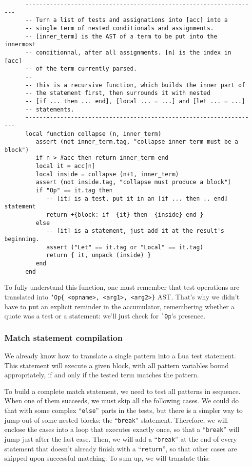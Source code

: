 \begin{verbatim}
      -------------------------------------------------------------------
      -- Turn a list of tests and assignations into [acc] into a
      -- single term of nested conditionals and assignments.
      -- [inner_term] is the AST of a term to be put into the innermost
      -- conditionnal, after all assignments. [n] is the index in [acc]
      -- of the term currently parsed.
      -- 
      -- This is a recursive function, which builds the inner part of
      -- the statement first, then surrounds it with nested 
      -- [if ... then ... end], [local ... = ...] and [let ... = ...]
      -- statements.
      -------------------------------------------------------------------
      local function collapse (n, inner_term)
         assert (not inner_term.tag, "collapse inner term must be a block")
         if n > #acc then return inner_term end
         local it = acc[n]
         local inside = collapse (n+1, inner_term)
         assert (not inside.tag, "collapse must produce a block")
         if "Op" == it.tag then 
            -- [it] is a test, put it in an [if ... then .. end] statement
            return +{block: if -{it} then -{inside} end }
         else 
            -- [it] is a statement, just add it at the result's  beginning.
            assert ("Let" == it.tag or "Local" == it.tag)
            return { it, unpack (inside) }
         end
      end
\end{verbatim}

To fully understand this function, one must remember that test
operations are translated into {\tt`Op\{ <opname>, <arg1>, <arg2>\}}
AST. That's why we didn't have to put an explicit reminder in the
accumulator, remembering whether a quote was a test or a statement:
we'll just check for \verb|`Op|'s presence.

\subsubsection{Match statement compilation}
We already know how to translate a single pattern into a Lua test
statement. This statement will execute a given block, with all pattern
variables bound appropriately, if and only if the tested term matches
the pattern.

To build a complete match statement, we need to test all patterns in
sequence. When one of them succeeds, we must skip all the following
cases. We could do that with some complex ``\verb|else|'' parts in the
tests, but there is a simpler way to jump out of some nested blocks:
the ``\verb|break|'' statement. Therefore, we will enclose the cases
into a loop that executes exactly once, so that a ``\verb|break|''
will jump just after the last case. Then, we will add a
``\verb|break|'' at the end of every statement that doesn't already
finish with a ``\verb|return|'', so that other cases are skipped upon
successful matching. To sum up, we will translate this:

